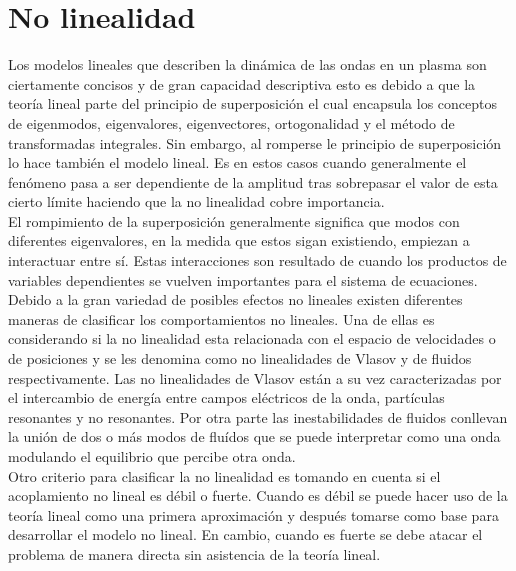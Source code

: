 \documentclass[../tesis_main_file.tex]{subfiles}
\begin{document}
\onlyinsubfile{\setcounter{chapter}{1}}
\section{No linealidad}
Los modelos lineales que describen la dinámica de las ondas en un plasma son ciertamente concisos y de gran capacidad descriptiva esto es debido a que la teoría lineal parte del principio de superposición el cual encapsula  los conceptos de eigenmodos, eigenvalores, eigenvectores, ortogonalidad y el método de transformadas integrales. Sin embargo, al romperse le principio de superposición lo hace también el modelo lineal. Es en estos casos cuando generalmente el fenómeno pasa a ser dependiente de la amplitud tras sobrepasar el valor de esta cierto límite haciendo que la no linealidad cobre importancia.\\
El rompimiento de la superposición generalmente significa que modos con diferentes eigenvalores, en la medida que estos sigan existiendo, empiezan a interactuar entre sí. Estas interacciones son resultado de cuando los productos de variables dependientes se vuelven importantes para el sistema de ecuaciones.
Debido a la gran variedad de posibles efectos no lineales existen diferentes maneras de clasificar los comportamientos no lineales. Una de ellas es considerando si la no linealidad esta relacionada con el espacio de velocidades o de posiciones y se les denomina como no linealidades de Vlasov y de fluidos respectivamente. Las no linealidades de Vlasov están a su vez caracterizadas por el intercambio de energía entre campos eléctricos de la onda, partículas resonantes y no resonantes. Por otra parte las inestabilidades de fluidos conllevan la unión de dos o más modos de fluídos que se puede interpretar como una onda modulando el equilibrio que percibe otra onda.\\
Otro criterio para clasificar la no linealidad es tomando en cuenta si el acoplamiento no lineal es débil o fuerte. Cuando es débil se puede hacer uso de la teoría lineal como una primera aproximación y después tomarse como base para desarrollar el modelo no lineal. En cambio, cuando es fuerte se debe atacar el problema de manera directa sin asistencia de la teoría lineal.
\end{document}
